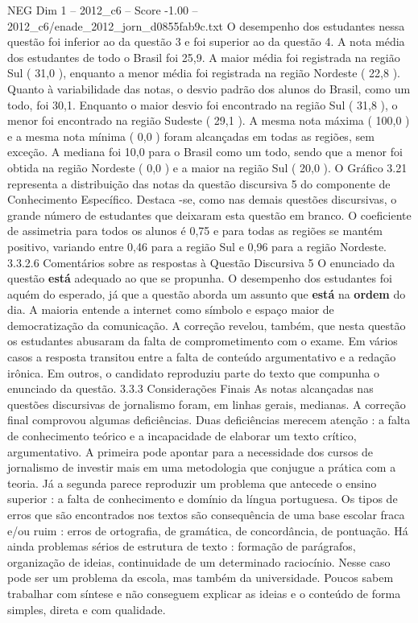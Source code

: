 \begin{textsample}{NEG Dim 1 – 2012\_c6 – Score -1.00 – 2012\_c6/enade\_2012\_jorn\_d0855fab9c.txt}
O desempenho dos estudantes nessa questão foi inferior ao da questão 3 e foi superior ao da questão 4.
A nota média dos estudantes de todo o Brasil foi 25,9.
A maior média foi registrada na região Sul ( 31,0 ), enquanto a menor média foi registrada na região Nordeste ( 22,8 ).
Quanto à variabilidade das notas, o desvio padrão dos alunos do Brasil, como um todo, foi 30,1.
Enquanto o maior desvio foi encontrado na região Sul ( 31,8 ), o menor foi encontrado na região Sudeste ( 29,1 ).
A mesma nota máxima ( 100,0 ) e a mesma nota mínima ( 0,0 ) foram alcançadas em todas as regiões, sem exceção.
A mediana foi 10,0 para o Brasil como um todo, sendo que a menor foi obtida na região Nordeste ( 0,0 ) e a maior na região Sul ( 20,0 ).
O Gráfico 3.21 representa a distribuição das notas da questão discursiva 5 do componente de Conhecimento Específico.
Destaca -se, como nas demais questões discursivas, o grande número de estudantes que deixaram esta questão em branco.
O coeficiente de assimetria para todos os alunos é 0,75 e para todas as regiões se mantém positivo, variando entre 0,46 para a região Sul e 0,96 para a região Nordeste. 3.3.2.6 Comentários sobre as respostas à Questão Discursiva 5 O enunciado da questão \textbf{está} adequado ao que se propunha.
O desempenho dos estudantes foi aquém do esperado, já que a questão aborda um assunto que \textbf{está} na \textbf{ordem} do dia.
A maioria entende a internet como símbolo e espaço maior de democratização da comunicação.
A correção revelou, também, que nesta questão os estudantes abusaram da falta de comprometimento com o exame.
Em vários casos a resposta transitou entre a falta de conteúdo argumentativo e a redação irônica.
Em outros, o candidato reproduziu parte do texto que compunha o enunciado da questão. 3.3.3 Considerações Finais As notas alcançadas nas questões discursivas de jornalismo foram, em linhas gerais, medianas.
A correção final comprovou algumas deficiências.
Duas deficiências merecem atenção : a falta de conhecimento teórico e a incapacidade de elaborar um texto crítico, argumentativo.
A primeira pode apontar para a necessidade dos cursos de jornalismo de investir mais em uma metodologia que conjugue a prática com a teoria.
Já a segunda parece reproduzir um problema que antecede o ensino superior : a falta de conhecimento e domínio da língua portuguesa.
Os tipos de erros que são encontrados nos textos são consequência de uma base escolar fraca e/ou ruim : erros de ortografia, de gramática, de concordância, de pontuação.
Há ainda problemas sérios de estrutura de texto : formação de parágrafos, organização de ideias, continuidade de um determinado raciocínio.
Nesse caso pode ser um problema da escola, mas também da universidade.
Poucos sabem trabalhar com síntese e não conseguem explicar as ideias e o conteúdo de forma simples, direta e com qualidade.

\end{textsample}
